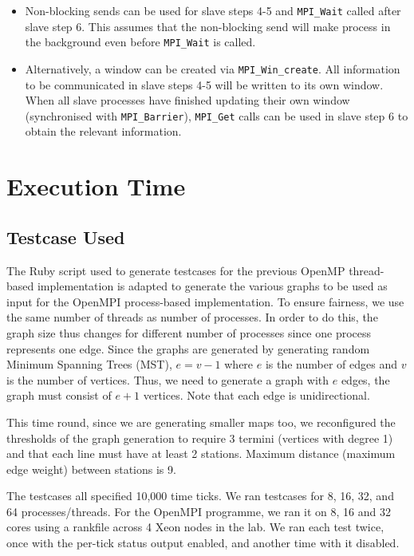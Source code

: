 \documentclass[a4paper,12pt]{article}
\begin{document}
\begin{itemize}
	      \begin{itemize}
		      \item Non-blocking sends can be used for slave steps 4-5 and \texttt{MPI_Wait} called after slave step 6. This assumes that the non-blocking send will make process in the background even before \texttt{MPI_Wait} is called.
		      \item Alternatively, a window can be created via \texttt{MPI_Win_create}. All information to be communicated in slave steps 4-5 will be written to its own window. When all slave processes have finished updating their own window (synchronised with \texttt{MPI_Barrier}), \texttt{MPI_Get} calls can be used in slave step 6 to obtain the relevant information.
	      \end{itemize}
\end{itemize}

\section{Execution Time}

\subsection{Testcase Used}
The Ruby script used to generate testcases for the previous OpenMP thread-based implementation is adapted to generate the various graphs to be used as input for the OpenMPI process-based implementation. To ensure fairness, we use the same number of threads as number of processes. In order to do this, the graph size thus changes for different number of processes since one process represents one edge. Since the graphs are generated by generating random Minimum Spanning Trees (MST), $e = v - 1$ where $e$ is the number of edges and $v$ is the number of vertices. Thus, we need to generate a graph with $e$ edges, the graph must consist of $e+1$ vertices. Note that each edge is unidirectional.

This time round, since we are generating smaller maps too, we reconfigured the thresholds of the graph generation to require 3 termini (vertices with degree 1) and that each line must have at least 2 stations. Maximum distance (maximum edge weight) between stations is 9.

The testcases all specified 10,000 time ticks. We ran testcases for 8, 16, 32, and 64 processes/threads. For the OpenMPI programme, we ran it on 8, 16 and 32 cores using a rankfile across 4 Xeon nodes in the lab. We ran each test twice, once with the per-tick status output enabled, and another time with it disabled.
\end{document}
